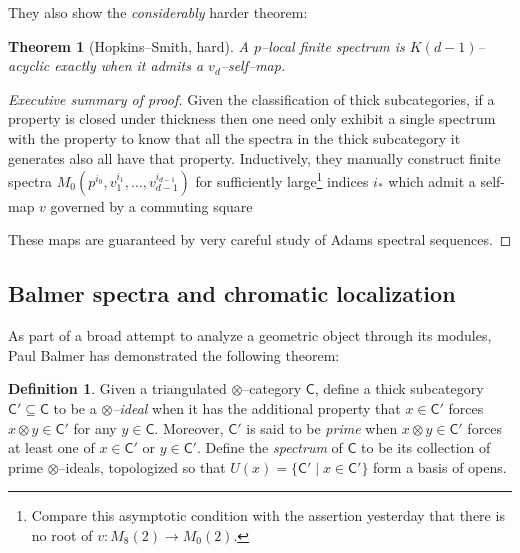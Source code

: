 \documentclass{amsart}
\newcommand{\<}{\langle}
\renewcommand{\>}{\rangle}
\newcommand{\Susp}{\Sigma}
\newcommand{\CatOf}[1]{\mathsf{#1}}
\theoremstyle{plain}
\newtheorem*{theorem}{Theorem}
\theoremstyle{definition}
\newtheorem*{definition}{Definition}
\theoremstyle{remark}
\begin{document}
They also show the \emph{considerably} harder theorem:

\begin{theorem}[Hopkins--Smith, hard]
A $p$--local finite spectrum is $K(d-1)$--acyclic exactly when it admits a $v_d$--self--map.
\end{theorem}
\begin{proof}[Executive summary of proof]
Given the classification of thick subcategories, if a property is closed under thickness then one need only exhibit a single spectrum with the property to know that all the spectra in the thick subcategory it generates also all have that property.  Inductively, they manually construct finite spectra $M_0(p^{i_0}, v_1^{i_1}, \ldots, v_{d-1}^{i_{d-1}})$ for sufficiently large\footnote{Compare this asymptotic condition with the assertion yesterday that there is no root of $v: M_8(2) \to M_0(2)$.} indices $i_*$ which admit a self-map $v$ governed by a commuting square
\begin{center}
\end{center}
These maps are guaranteed by very careful study of Adams spectral sequences.
\end{proof}


\subsection{Balmer spectra and chromatic localization}

As part of a broad attempt to analyze a geometric object through its modules, Paul Balmer has demonstrated the following theorem:

\begin{definition}
Given a triangulated $\otimes$--category $\CatOf C$, define a thick subcategory $\CatOf C' \subseteq \CatOf C$ to be a \textit{$\otimes$--ideal} when it has the additional property that $x \in \CatOf C'$ forces $x \otimes y \in \CatOf C'$ for any $y \in \CatOf C$.  Moreover, $\CatOf C'$ is said to be \textit{prime} when $x \otimes y \in \CatOf C'$ forces at least one of $x \in \CatOf C'$ or $y \in \CatOf C'$.  Define the \textit{spectrum} of $\CatOf C$ to be its collection of prime $\otimes$--ideals, topologized so that $U(x) = \{\CatOf C' \mid x \in \CatOf C'\}$ form a basis of opens.
\end{definition}
\end{document}
